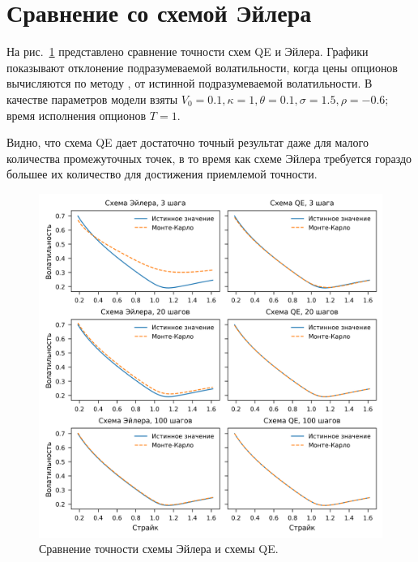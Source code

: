 \section{Сравнение со схемой Эйлера}
На рис.~\ref{qe:f:comparison} представлено сравнение точности схем QE и Эйлера.
Графики показывают отклонение подразумеваемой волатильности, когда цены опционов вычисляются по методу \mc, от истинной подразумеваемой волатильности. 
В качестве параметров модели взяты $V_0=0.1,\kappa=1, \theta=0.1,\sigma=1.5,\rho=-0.6$; время исполнения опционов $T=1$.

Видно, что схема QE дает достаточно точный результат даже для малого количества промежуточных точек, в то время как схеме Эйлера требуется гораздо большее их количество для достижения приемлемой точности.

\begin{figure}[h]
\centering
\includegraphics{pic/heston-qe.png}  
\caption{Сравнение точности схемы Эйлера и схемы QE.}
\label{qe:f:comparison}
\end{figure}
